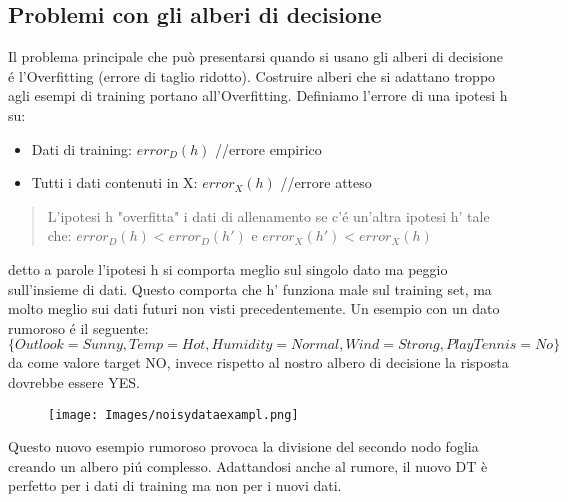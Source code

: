 \documentclass{article}
\begin{document}
\subsection{Problemi con gli alberi di decisione}
Il problema principale che può presentarsi quando si usano gli alberi di decisione é l'Overfitting (errore di taglio ridotto). Costruire alberi che si adattano troppo agli esempi di training portano all'Overfitting. Definiamo l'errore di una ipotesi h su:
\begin{itemize}
    \item Dati di training: $error_D(h)$ //errore empirico
    \item Tutti i dati contenuti in X: $error_X(h)$ //errore atteso
\end{itemize}
\begin{quote}
    L'ipotesi h "overfitta" i dati di allenamento se c'é un'altra ipotesi h' tale che: \newline
    $error_D(h)<error_D(h')$ e $error_X(h') < error_X(h)$
\end{quote}
detto a parole l'ipotesi h si comporta meglio sul singolo dato ma peggio sull'insieme di dati. Questo comporta che h' funziona male sul training set, ma molto meglio sui dati futuri non visti precedentemente. \newline
Un esempio con un dato rumoroso é il seguente: $\{Outlook=Sunny, Temp=Hot, Humidity=Normal, Wind=Strong, PlayTennis=No\}$ da come valore target NO, invece rispetto al nostro albero di decisione la risposta dovrebbe essere YES. 
\begin{figure}[H]
\centering
\texttt{[image: Images/noisydataexampl.png]}
\end{figure}
Questo nuovo esempio rumoroso provoca la divisione del secondo nodo foglia creando un albero piú complesso. Adattandosi anche al rumore, il nuovo DT è perfetto per i dati di training ma non per i nuovi dati.
\end{document}
